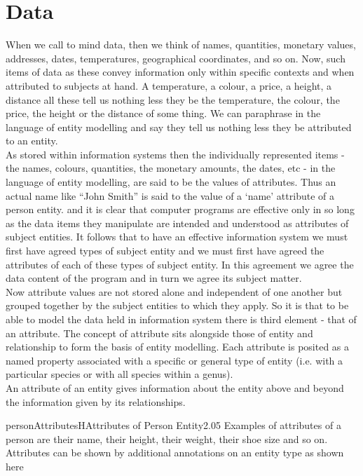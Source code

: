 \section {Data}
When we call to mind data, then we think of names, quantities, monetary values, 
addresses, dates, temperatures, geographical coordinates, and so on. Now, such items 
of data as these convey information only within specific contexts and when attributed 
to subjects at hand. A temperature, a colour, a price, a height, a distance all these 
tell us nothing less they be the temperature, the colour, the price, the height or the 
distance of some thing. We can paraphrase in the language of entity modelling and 
say they tell us nothing less they be attributed to an entity. \\

\noindent As stored within information systems then the individually represented items - the 
names, colours, quantities, the monetary amounts, the dates, etc - in the language 
of entity modelling, are said to be the values of attributes. Thus an actual name 
like ``John Smith'' is said to the value of a `name' attribute of a person entity.
 and it is clear that computer programs are effective only in so long as the data items 
they manipulate are intended and understood as attributes of subject entities. It 
follows that to have an effective information system we must first have agreed types 
of subject entity and we must first have agreed the attributes of each of these types of 
subject entity. In this agreement we agree the data content of the program and in turn 
we agree its subject matter.\\

\noindent Now attribute values are not stored alone and independent of one another but grouped 
together by the subject entities to which they apply. So it is that to be able to model 
the data held in information system there is third element - that of an attribute. 
The concept of attribute sits alongside those of entity and relationship to form the 
basis of entity modelling. Each attribute is posited as a named property associated 
with a specific or general type of entity (i.e. with a particular species or with all 
species within a genus). \\

\noindent An attribute of an entity gives information about the entity above and beyond the 
information given by its relationships. \\

\begin{ernotedDimFig}{personAttributes}{H}{Attributes of Person Entity}{2.0}{5}
Examples of attributes of a person are their 
name, their height, their weight, their shoe size and so on. Attributes can be shown by 
additional annotations on an entity type as shown here
\end{ernotedDimFig}

